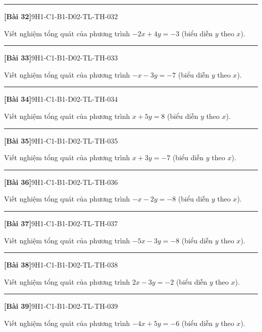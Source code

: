 \documentclass[12pt,a4paper]{article}
\newif\ifloigiai
\newenvironment{cauhoi}[2]{%
  \par\medskip\noindent\rule{\textwidth}{0.4pt}\par\nopagebreak
  \noindent\textbf{[#1]}\hfill{\scriptsize\ttfamily #2}\par\nopagebreak\smallskip}{\par}
\newcommand{\loigiai}[1]{\ifloigiai\par\smallskip\noindent\textit{Lời giải.} #1\par\fi}
\begin{document}
\begin{cauhoi}{Bài 32}{9H1-C1-B1-D02-TL-TH-032}
Viết nghiệm tổng quát của phương trình $-2x+4y=-3$ (biểu diễn $y$ theo $x$).
\loigiai{Ta có $4y=-3+2x$ nên $y=\dfrac{1}{2}x-\dfrac{3}{4}$. Nghiệm tổng quát là $(x;\,\dfrac{1}{2}x-\dfrac{3}{4})$ với $x\in\mathbb R$.}
\end{cauhoi}
\begin{cauhoi}{Bài 33}{9H1-C1-B1-D02-TL-TH-033}
Viết nghiệm tổng quát của phương trình $-x-3y=-7$ (biểu diễn $y$ theo $x$).
\loigiai{Ta có $-3y=-7+x$ nên $y=-\dfrac{1}{3}x+\dfrac{7}{3}$. Nghiệm tổng quát là $(x;\,-\dfrac{1}{3}x+\dfrac{7}{3})$ với $x\in\mathbb R$.}
\end{cauhoi}
\begin{cauhoi}{Bài 34}{9H1-C1-B1-D02-TL-TH-034}
Viết nghiệm tổng quát của phương trình $x+5y=8$ (biểu diễn $y$ theo $x$).
\loigiai{Ta có $5y=8-x$ nên $y=-\dfrac{1}{5}x+\dfrac{8}{5}$. Nghiệm tổng quát là $(x;\,-\dfrac{1}{5}x+\dfrac{8}{5})$ với $x\in\mathbb R$.}
\end{cauhoi}
\begin{cauhoi}{Bài 35}{9H1-C1-B1-D02-TL-TH-035}
Viết nghiệm tổng quát của phương trình $x+3y=-7$ (biểu diễn $y$ theo $x$).
\loigiai{Ta có $3y=-7-x$ nên $y=-\dfrac{1}{3}x-\dfrac{7}{3}$. Nghiệm tổng quát là $(x;\,-\dfrac{1}{3}x-\dfrac{7}{3})$ với $x\in\mathbb R$.}
\end{cauhoi}
\begin{cauhoi}{Bài 36}{9H1-C1-B1-D02-TL-TH-036}
Viết nghiệm tổng quát của phương trình $-x-2y=-8$ (biểu diễn $y$ theo $x$).
\loigiai{Ta có $-2y=-8+x$ nên $y=-\dfrac{1}{2}x+4$. Nghiệm tổng quát là $(x;\,-\dfrac{1}{2}x+4)$ với $x\in\mathbb R$.}
\end{cauhoi}
\begin{cauhoi}{Bài 37}{9H1-C1-B1-D02-TL-TH-037}
Viết nghiệm tổng quát của phương trình $-5x-3y=-8$ (biểu diễn $y$ theo $x$).
\loigiai{Ta có $-3y=-8+5x$ nên $y=-\dfrac{5}{3}x+\dfrac{8}{3}$. Nghiệm tổng quát là $(x;\,-\dfrac{5}{3}x+\dfrac{8}{3})$ với $x\in\mathbb R$.}
\end{cauhoi}
\begin{cauhoi}{Bài 38}{9H1-C1-B1-D02-TL-TH-038}
Viết nghiệm tổng quát của phương trình $2x-3y=-2$ (biểu diễn $y$ theo $x$).
\loigiai{Ta có $-3y=-2-2x$ nên $y=\dfrac{2}{3}x+\dfrac{2}{3}$. Nghiệm tổng quát là $(x;\,\dfrac{2}{3}x+\dfrac{2}{3})$ với $x\in\mathbb R$.}
\end{cauhoi}
\begin{cauhoi}{Bài 39}{9H1-C1-B1-D02-TL-TH-039}
Viết nghiệm tổng quát của phương trình $-4x+5y=-6$ (biểu diễn $y$ theo $x$).
\loigiai{Ta có $5y=-6+4x$ nên $y=\dfrac{4}{5}x-\dfrac{6}{5}$. Nghiệm tổng quát là $(x;\,\dfrac{4}{5}x-\dfrac{6}{5})$ với $x\in\mathbb R$.}
\end{cauhoi}
\end{document}
